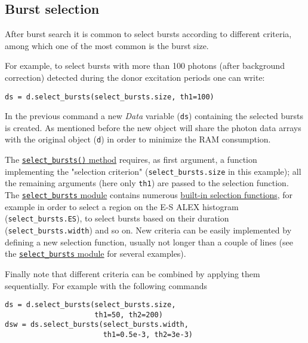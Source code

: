\subsection{Burst selection}
\label{sec:burstsel}

After burst search it is common to select bursts according to different
criteria, among which one of the most common is the burst size.

For example, to select bursts with more than 100 photons (after background
correction) detected during the donor excitation periods one can write:

\begin{verbatim}
ds = d.select_bursts(select_bursts.size, th1=100)
\end{verbatim}

In the previous command a new \textit{Data} variable (\verb|ds|) containing the selected
bursts is created. As mentioned before the new object will share the photon data
arrays with the original object (\verb|d|) in order to minimize the RAM
consumption.

The
\href{http://fretbursts.readthedocs.org/en/latest/data_class.html#burst-selection-methods}{\texttt{select\_bursts()} method}
requires, as first argument, a function implementing the "selection criterion" (\verb|select_bursts.size| 
in this example); all the remaining arguments (here only \verb|th1|) are passed to the selection function. The
\href{http://fretbursts.readthedocs.org/en/latest/burst_selection.html}{\texttt{select\_bursts} module} 
contains numerous 
\href{http://fretbursts.readthedocs.org/en/latest/burst_selection.html#module-fretbursts.select_bursts}{built-in selection functions}, 
for example in order to select a region on the E-S ALEX histogram (\verb|select_bursts.ES|), 
to select bursts based on their duration (\verb|select_bursts.width|) and so on.
New criteria can be easily implemented by defining a new selection function, usually 
not longer than a couple of lines (see the
\href{https://github.com/tritemio/FRETBursts/blob/master/fretbursts/select\_bursts.py}{\texttt{select\_bursts} module} for several examples).

Finally note that different criteria can be combined by applying them sequentially. 
For example with the following commands

\begin{verbatim}
ds = d.select_bursts(select_bursts.size, 
                     th1=50, th2=200)
dsw = ds.select_bursts(select_bursts.width, 
                       th1=0.5e-3, th2=3e-3)
\end{verbatim}

